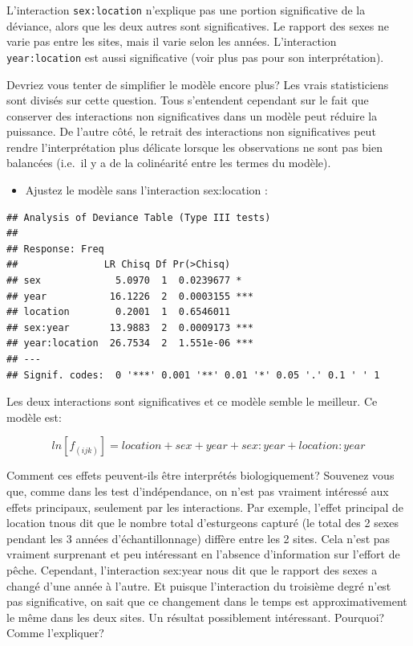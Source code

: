\documentclass[
  12pt,
]{book}
\providecommand{\tightlist}{%
  \setlength{\itemsep}{0pt}\setlength{\parskip}{0pt}}
\begin{document}
L'interaction \texttt{sex:location} n'explique pas une portion significative de la déviance, alors que les deux autres sont significatives. Le rapport des sexes ne varie pas entre les sites, mais il varie selon les années. L'interaction \texttt{year:location} est aussi significative (voir plus pas pour son interprétation).

Devriez vous tenter de simplifier le modèle encore plus? Les vrais statisticiens sont divisés sur cette question. Tous s'entendent cependant sur le fait que conserver des interactions non significatives dans un modèle peut réduire la puissance. De l'autre côté, le retrait des interactions non significatives peut rendre l'interprétation plus délicate lorsque les observations ne sont pas bien balancées (i.e.~il y a de la colinéarité entre les termes du modèle).

\begin{itemize}
\tightlist
\item
  Ajustez le modèle sans l'interaction sex:location :
\end{itemize}

\begin{verbatim}
## Analysis of Deviance Table (Type III tests)
## 
## Response: Freq
##               LR Chisq Df Pr(>Chisq)    
## sex             5.0970  1  0.0239677 *  
## year           16.1226  2  0.0003155 ***
## location        0.2001  1  0.6546011    
## sex:year       13.9883  2  0.0009173 ***
## year:location  26.7534  2  1.551e-06 ***
## ---
## Signif. codes:  0 '***' 0.001 '**' 0.01 '*' 0.05 '.' 0.1 ' ' 1
\end{verbatim}

Les deux interactions sont significatives et ce modèle semble le meilleur. Ce modèle est:

\[ln[f_{(ijk)} ] = location + sex + year + sex:year + location:year\]

Comment ces effets peuvent-ils être interprétés biologiquement? Souvenez vous que, comme dans les test d'indépendance, on n'est pas vraiment intéressé aux effets principaux, seulement par les interactions. Par exemple, l'effet principal de location tnous dit que le nombre total d'esturgeons capturé (le total des 2 sexes pendant les 3 années d'échantillonnage) diffère entre les 2 sites. Cela n'est pas vraiment surprenant et peu intéressant en l'absence d'information sur l'effort de pêche. Cependant, l'interaction sex:year nous dit que le rapport des sexes a changé d'une année à l'autre. Et puisque l'interaction du troisième degré n'est pas significative, on sait que ce changement dans le temps est approximativement le même dans les deux sites. Un résultat possiblement intéressant. Pourquoi? Comme l'expliquer?
\end{document}
